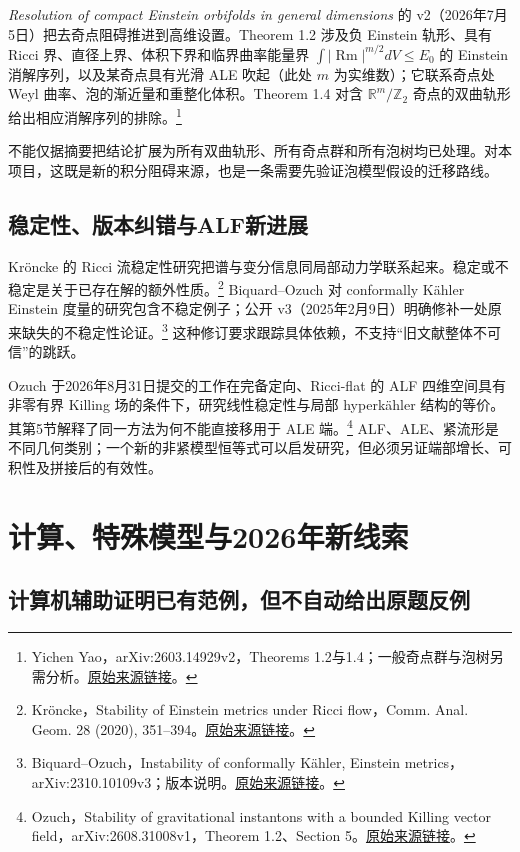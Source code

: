 \documentclass[11pt,a4paper]{article}
\theoremstyle{definition}
\newcommand{\Rm}{\operatorname{Rm}}
\newcommand{\src}[3]{\footnote{\raggedright #1，#2。\href{#3}{原始来源链接}。}}
\begin{document}
\emph{Resolution of compact Einstein orbifolds in general dimensions} 的 v2（2026年7月5日）把去奇点阻碍推进到高维设置。Theorem 1.2 涉及负 Einstein 轨形、具有 Ricci 界、直径上界、体积下界和临界曲率能量界 $\int|\Rm|^{m/2}dV\le E_0$ 的 Einstein 消解序列，以及某奇点具有光滑 ALE 吹起（此处 $m$ 为实维数）；它联系奇点处 Weyl 曲率、泡的渐近量和重整化体积。Theorem 1.4 对含 $\mathbb R^m/\mathbb Z_2$ 奇点的双曲轨形给出相应消解序列的排除。\src{Yichen Yao}{arXiv:2603.14929v2，Theorems 1.2与1.4；一般奇点群与泡树另需分析}{https://arxiv.org/html/2603.14929v2}

不能仅据摘要把结论扩展为所有双曲轨形、所有奇点群和所有泡树均已处理。对本项目，这既是新的积分阻碍来源，也是一条需要先验证泡模型假设的迁移路线。

\subsection{稳定性、版本纠错与ALF新进展}

Kröncke 的 Ricci 流稳定性研究把谱与变分信息同局部动力学联系起来。稳定或不稳定是关于已存在解的额外性质。\src{Kröncke}{Stability of Einstein metrics under Ricci flow，Comm. Anal. Geom. 28 (2020), 351--394}{https://doi.org/10.4310/CAG.2020.v28.n2.a5}
Biquard--Ozuch 对 conformally Kähler Einstein 度量的研究包含不稳定例子；公开 v3（2025年2月9日）明确修补一处原来缺失的不稳定性论证。\src{Biquard--Ozuch}{Instability of conformally Kähler, Einstein metrics，arXiv:2310.10109v3；版本说明}{https://arxiv.org/abs/2310.10109v3}
这种修订要求跟踪具体依赖，不支持“旧文献整体不可信”的跳跃。

Ozuch 于2026年8月31日提交的工作在完备定向、Ricci-flat 的 ALF 四维空间具有非零有界 Killing 场的条件下，研究线性稳定性与局部 hyperkähler 结构的等价。其第5节解释了同一方法为何不能直接移用于 ALE 端。\src{Ozuch}{Stability of gravitational instantons with a bounded Killing vector field，arXiv:2608.31008v1，Theorem 1.2、Section 5}{https://arxiv.org/html/2608.31008v1}
ALF、ALE、紧流形是不同几何类别；一个新的非紧模型恒等式可以启发研究，但必须另证端部增长、可积性及拼接后的有效性。

\section{计算、特殊模型与2026年新线索}

\subsection{计算机辅助证明已有范例，但不自动给出原题反例}
\end{document}
